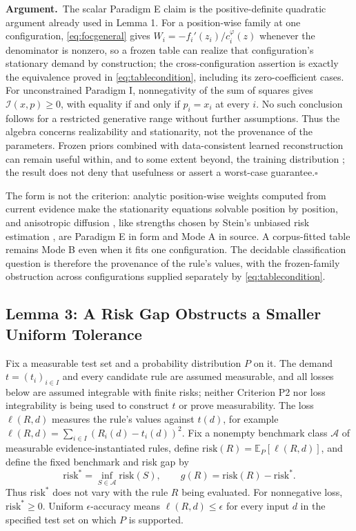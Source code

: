 \documentclass[twoside,11pt]{article}
\newcommand{\argument}{\par\medskip\noindent\textbf{Argument.}\ }
\newcommand{\qedbox}{\hfill$\square$}
\begin{document}
\argument The scalar Paradigm E claim is the positive-definite quadratic argument already used in Lemma 1. For a position-wise family at one configuration, \eqref{eq:focgeneral} gives $W_i=-f_i'(z_i)/c_i^{\varphi}(z)$ whenever the denominator is nonzero, so a frozen table can realize that configuration's stationary demand by construction; the cross-configuration assertion is exactly the equivalence proved in \eqref{eq:tablecondition}, including its zero-coefficient cases. For unconstrained Paradigm I, nonnegativity of the sum of squares gives $\mathcal{I}(x,p)\geq0$, with equality if and only if $p_i=x_i$ at every $i$. No such conclusion follows for a restricted generative range without further assumptions. Thus the algebra concerns realizability and stationarity, not the provenance of the parameters. Frozen priors combined with data-consistent learned reconstruction can remain useful within, and to some extent beyond, the training distribution \citep{haltmeier2026}; the result does not deny that usefulness or assert a worst-case guarantee.\qedbox

The form is not the criterion: analytic position-wise weights computed from current evidence make the stationarity equations solvable position by position, and anisotropic diffusion \citep{perona1990}, like strengths chosen by Stein's unbiased risk estimation \citep{stein1981}, are Paradigm E in form and Mode A in source. A corpus-fitted table remains Mode B even when it fits one configuration. The decidable classification question is therefore the provenance of the rule's values, with the frozen-family obstruction across configurations supplied separately by \eqref{eq:tablecondition}.

\subsection{Lemma 3: A Risk Gap Obstructs a Smaller Uniform Tolerance}

Fix a measurable test set and a probability distribution $P$ on it. The demand $t=(t_i)_{i\in I}$ and every candidate rule are assumed measurable, and all losses below are assumed integrable with finite risks; neither Criterion P2 nor loss integrability is being used to construct $t$ or prove measurability. The loss $\ell(R,d)$ measures the rule's values against $t(d)$, for example $\ell(R,d)=\sum_{i\in I}(R_i(d)-t_i(d))^2$. Fix a nonempty benchmark class $\mathcal{A}$ of measurable evidence-instantiated rules, define $\mathrm{risk}(R)=\mathbb{E}_P[\ell(R,d)]$, and define the fixed benchmark and risk gap by
\begin{equation}
\mathrm{risk}^* = \inf_{S\in\mathcal{A}}\mathrm{risk}(S), \qquad g(R) = \mathrm{risk}(R) - \mathrm{risk}^* .
\label{eq:gap}%
\end{equation}%
Thus $\mathrm{risk}^*$ does not vary with the rule $R$ being evaluated. For nonnegative loss, $\mathrm{risk}^*\geq0$. Uniform $\epsilon$-accuracy means $\ell(R,d)\leq\epsilon$ for every input $d$ in the specified test set on which $P$ is supported.
\end{document}
